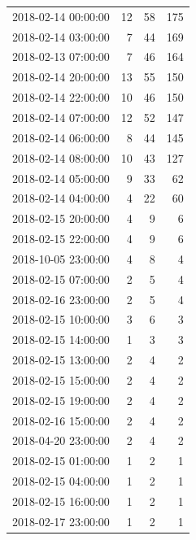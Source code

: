 \begin{tabular}{lrrr}
2018-02-14 00:00:00 & 12 & 58 & 175 \\
2018-02-14 03:00:00 & 7 & 44 & 169 \\
2018-02-13 07:00:00 & 7 & 46 & 164 \\
2018-02-14 20:00:00 & 13 & 55 & 150 \\
2018-02-14 22:00:00 & 10 & 46 & 150 \\
2018-02-14 07:00:00 & 12 & 52 & 147 \\
2018-02-14 06:00:00 & 8 & 44 & 145 \\
2018-02-14 08:00:00 & 10 & 43 & 127 \\
2018-02-14 05:00:00 & 9 & 33 & 62 \\
2018-02-14 04:00:00 & 4 & 22 & 60 \\
2018-02-15 20:00:00 & 4 & 9 & 6 \\
2018-02-15 22:00:00 & 4 & 9 & 6 \\
2018-10-05 23:00:00 & 4 & 8 & 4 \\
2018-02-15 07:00:00 & 2 & 5 & 4 \\
2018-02-16 23:00:00 & 2 & 5 & 4 \\
2018-02-15 10:00:00 & 3 & 6 & 3 \\
2018-02-15 14:00:00 & 1 & 3 & 3 \\
2018-02-15 13:00:00 & 2 & 4 & 2 \\
2018-02-15 15:00:00 & 2 & 4 & 2 \\
2018-02-15 19:00:00 & 2 & 4 & 2 \\
2018-02-16 15:00:00 & 2 & 4 & 2 \\
2018-04-20 23:00:00 & 2 & 4 & 2 \\
2018-02-15 01:00:00 & 1 & 2 & 1 \\
2018-02-15 04:00:00 & 1 & 2 & 1 \\
2018-02-15 16:00:00 & 1 & 2 & 1 \\
2018-02-17 23:00:00 & 1 & 2 & 1 \\
\bottomrule
\end{tabular}
